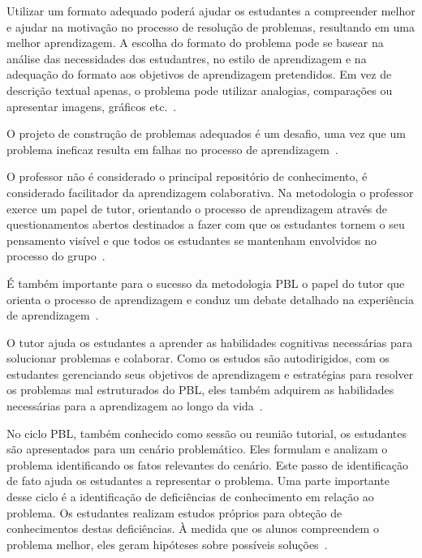 Utilizar um formato adequado poderá ajudar os estudantes
a compreender melhor e ajudar na motivação no processo
de resolução de problemas, resultando em uma
melhor aprendizagem.
A escolha do formato do problema pode se basear na análise
das necessidades dos estudantres, no estilo de aprendizagem
e na adequação do formato aos objetivos de
aprendizagem pretendidos.
Em vez de descrição textual apenas, o problema pode
utilizar analogias, comparações ou apresentar imagens,
gráficos etc.~\cite{sockalingam2011student}.

O projeto de construção de problemas adequados é um desafio, uma
vez que um problema ineficaz resulta em falhas no processo de
aprendizagem~\cite{azer2012twelve,amos1998problem,
des1999delphi,kukkamalla2011designing}.


O professor não é considerado o principal repositório
de conhecimento, é considerado facilitador da aprendizagem
colaborativa.
Na metodologia o professor exerce um papel de tutor, orientando
o processo de aprendizagem através de questionamentos abertos
destinados a fazer com que os estudantes tornem o seu pensamento
visível e que todos os estudantes se mantenham envolvidos
no processo do grupo~\cite{hmelo2004problem}.

É também importante para o sucesso da metodologia PBL o
papel do tutor que orienta o processo de aprendizagem
e conduz um debate detalhado na experiência de
aprendizagem~\cite{savery2015overview}.

O tutor ajuda os estudantes a aprender as habilidades cognitivas
necessárias para solucionar problemas e colaborar.
Como os estudos são autodirigidos, com os estudantes gerenciando
seus objetivos de aprendizagem e estratégias
para resolver os problemas mal estruturados do PBL, eles
também adquirem as habilidades necessárias para a
aprendizagem ao longo da vida~\cite{hmelo2004problem}.


No ciclo PBL, também conhecido como sessão ou reunião tutorial, os estudantes
são apresentados para um cenário problemático.
Eles formulam e analizam o problema identificando os fatos relevantes do cenário.
Este passo de identificação de fato ajuda os estudantes a representar o problema.
Uma parte importante desse ciclo é a identificação de deficiências
de conhecimento em relação ao problema.
Os estudantes realizam estudos próprios para obteção de
conhecimentos destas deficiências.
À medida que os alunos compreendem o problema melhor, eles geram
hipóteses sobre possíveis soluções~\cite{hmelo2004problem}.

